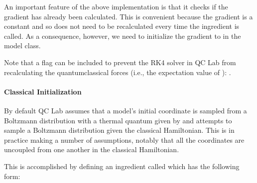 \documentclass[letterpaper,10pt,english]{sphinxmanual}
\begin{document}
\sphinxAtStartPar
An important feature of the above implementation is that it checks if the gradient has already been calculated. This is convenient because the gradient is a constant
and so does not need to be recalculated every time the ingredient is called. As a consequence, however, we need to initialize the gradient to  in the model class.

\begin{sphinxVerbatim}[commandchars=\\\{\}]
  
      
      
      
\end{sphinxVerbatim}

\sphinxAtStartPar
Note that a flag can be included to prevent the RK4 solver in QC Lab from recalculating the quantum\sphinxhyphen{}classical forces (i.e., the expectation value of ):
.


\paragraph{Classical Initialization}
\label{\detokenize{user_guide/model_dev:classical-initialization}}
\sphinxAtStartPar
By default QC Lab assumes that a model’s initial  coordinate is sampled from a Boltzmann distribution with a thermal quantum given by  and attempts to sample a
Boltzmann distribution given the classical Hamiltonian. This is in practice making a number of assumptions, notably that all the  coordinates are uncoupled from
one another in the classical Hamiltonian.

\sphinxAtStartPar
This is accomplished by defining an ingredient called  which has the following form:
\end{document}
